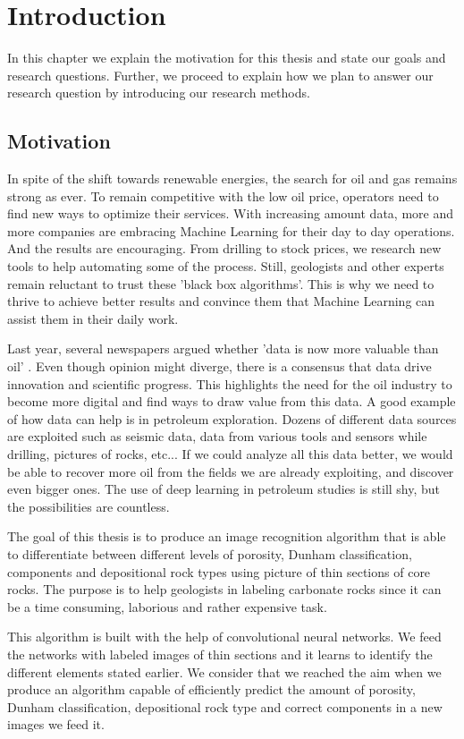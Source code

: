 \chapter{Introduction}
\label{chp:introduction} 
In this chapter we explain the motivation for this thesis and state our goals and research questions. Further, we  proceed to explain how we plan to answer our research question by introducing our research methods.   
\section{Motivation}
In spite of the shift towards renewable energies, the search for oil and gas remains strong as ever. To remain competitive with the low oil price, operators need to find new ways to optimize their services. 
With increasing amount data,  more and more companies are embracing Machine Learning for their day to day operations. And the results are encouraging. 
From drilling to stock prices, we research  new tools to help automating some of the process. 
Still, geologists and other experts remain reluctant to trust these 'black box algorithms'. This is why we need to thrive to achieve better results and convince them that Machine Learning can assist them in their daily work.

Last year, several newspapers argued whether 'data is now more valuable than oil' \cite{economist} \cite{forbes}. Even though opinion might diverge, there is a consensus that data drive innovation and scientific progress. This highlights the need for the oil industry to become more digital and find ways to draw value from this data. A good example of how data can help is in petroleum exploration. Dozens of different data sources are exploited such as seismic data, data from various tools and sensors while drilling, pictures of rocks, etc... If  we could analyze all this data better, we would be able to recover more oil from the fields we are already exploiting, and discover even bigger ones. The use of deep learning in petroleum studies is still shy, but the possibilities are countless.


The goal of this thesis is to produce an image recognition algorithm that is able to differentiate between different levels of porosity,  Dunham classification, components and depositional rock types using picture of thin sections of core rocks. The purpose is to help geologists in labeling carbonate rocks since it can be a time consuming, laborious and rather expensive task. 

This algorithm is built with the help of convolutional neural networks. We feed the networks with labeled images of thin sections and it learns to identify the different elements stated earlier. We consider that we reached the aim when we produce an algorithm capable of efficiently predict the amount of porosity, Dunham classification, depositional rock type and correct components in a new images we feed it. 

